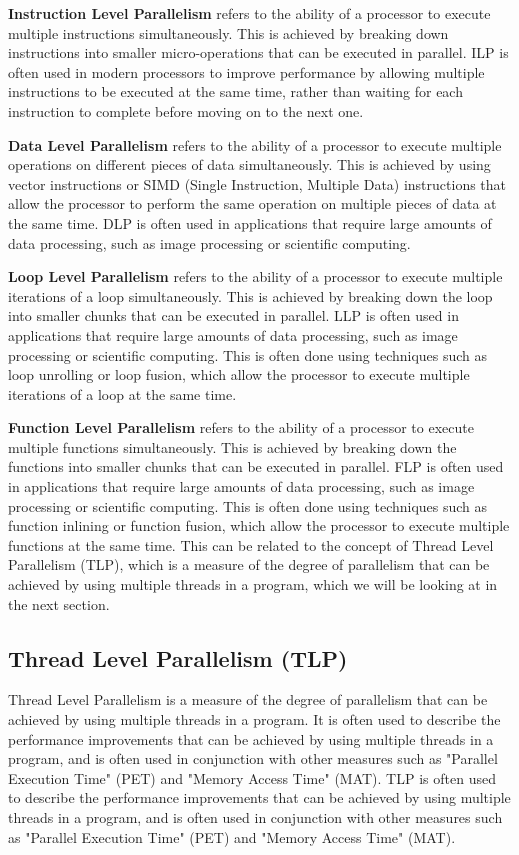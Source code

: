 \documentclass[12pt,a4paper]{article}
\begin{document}
\textbf{Instruction Level Parallelism} refers to the ability of a processor to execute multiple instructions simultaneously. This is achieved by breaking down instructions into smaller micro-operations that can be executed in parallel. ILP is often used in modern processors to improve performance by allowing multiple instructions to be executed at the same time, rather than waiting for each instruction to complete before moving on to the next one.

\textbf{Data Level Parallelism} refers to the ability of a processor to execute multiple operations on different pieces of data simultaneously. This is achieved by using vector instructions or SIMD (Single Instruction, Multiple Data) instructions that allow the processor to perform the same operation on multiple pieces of data at the same time. DLP is often used in applications that require large amounts of data processing, such as image processing or scientific computing.

\textbf{Loop Level Parallelism} refers to the ability of a processor to execute multiple iterations of a loop simultaneously. This is achieved by breaking down the loop into smaller chunks that can be executed in parallel. LLP is often used in applications that require large amounts of data processing, such as image processing or scientific computing. This is often done using techniques such as loop unrolling or loop fusion, which allow the processor to execute multiple iterations of a loop at the same time.

\textbf{Function Level Parallelism} refers to the ability of a processor to execute multiple functions simultaneously. This is achieved by breaking down the functions into smaller chunks that can be executed in parallel. FLP is often used in applications that require large amounts of data processing, such as image processing or scientific computing. This is often done using techniques such as function inlining or function fusion, which allow the processor to execute multiple functions at the same time. This can be related to the concept of Thread Level Parallelism (TLP), which is a measure of the degree of parallelism that can be achieved by using multiple threads in a program, which we will be looking at in the next section.

\subsection{Thread Level Parallelism (TLP)}
Thread Level Parallelism is a measure of the degree of parallelism that can be achieved by using multiple threads in a program. It is often used to describe the performance improvements that can be achieved by using multiple threads in a program, and is often used in conjunction with other measures such as "Parallel Execution Time" (PET) and "Memory Access Time" (MAT). TLP is often used to describe the performance improvements that can be achieved by using multiple threads in a program, and is often used in conjunction with other measures such as "Parallel Execution Time" (PET) and "Memory Access Time" (MAT).
\end{document}
